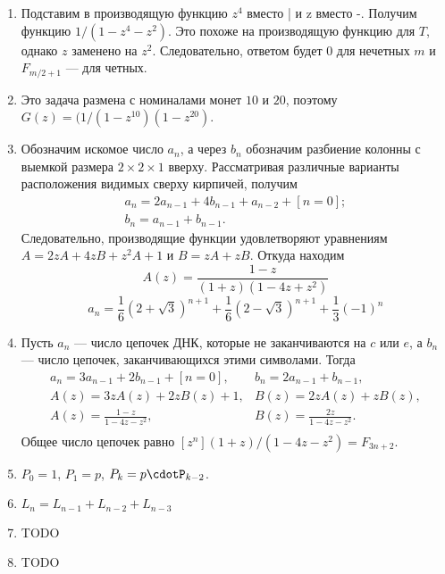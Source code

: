 \documentclass[14pt,openany]{book}
\begin{document}
\begin{enumerate}
\item Подставим в производящую функцию $z^4$ вместо | и z вместо -. Получим функцию $1/(1-z^4-z^2)$.
Это похоже на производящую функцию для $T$, однако $z$ заменено на $z^2$. Следовательно, 
ответом будет $0$ для нечетных $m$ и $F_{m/2+1}$ --- для четных.

\item Это задача размена с номиналами монет $10$ и $20$, поэтому $G(z)=(1/(1-z^{10})(1-z^{20})$.

\item Обозначим искомое число $a_n$, а через $b_n$ обозначим разбиение колонны с выемкой размера
      $2 \times 2 \times 1$ вверху. Рассматривая различные варианты расположения видимых сверху
      кирпичей, получим
$$
\begin{array}{ll}
a_n = 2a_{n-1} + 4b_{n-1} + a_{n-2} + [n=0]; \\
b_n = a_{n-1} + b_{n-1}.
\end{array}
$$
      Следовательно, производящие функции удовлетворяют уравнениям $A = 2zA+4zB+z^2A+1$ и
      $B = zA + zB$. Откуда находим $$A(z) = \frac{1-z}{(1+z)(1-4z+z^2)}$$
      $$a_n = \frac{1}{6}(2+\sqrt{3})^{n+1} + \frac{1}{6}(2-\sqrt{3})^{n+1} + \frac{1}{3}(-1)^n$$

\item Пусть $a_n$ --- число цепочек ДНК, которые не заканчиваются на $c$ или $e$, а $b_n$ --- число
      цепочек, заканчивающихся этими символами. Тогда
      $$
      \begin{array}{ll}
      a_n = 3a_{n-1}+2b_{n-1}+[n=0], & b_n = 2a_{n-1} + b_{n-1}, \\
      A(z) = 3zA(z) + 2zB(z) + 1,    & B(z) = 2zA(z) + zB(z), \\
      A(z) = \frac{1-z}{1-4z-z^2},   & B(z) = \frac{2z}{1-4z-z^2}. \\
      \end{array}
      $$
      Общее число цепочек равно $[z^n](1+z)/(1-4z-z^2) = F_{3n+2}$.

\item $P_0 = 1$, $P_1 = p$, $P_k = p\cdotP_{k-2}$.

\item $L_n = L_{n-1} + L_{n-2} + L_{n-3}$

\item TODO

\item TODO

\end{enumerate}
\end{document}
